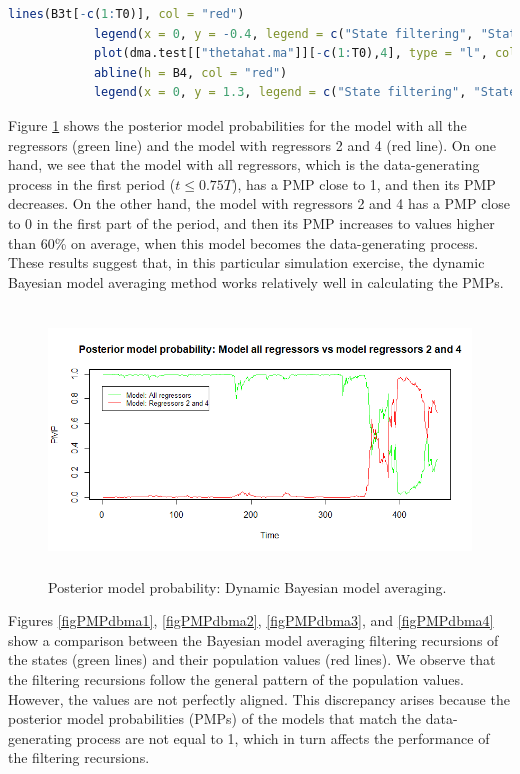 \begin{tcolorbox}[enhanced,width=4.67in,center upper,
	fontupper=\large\bfseries,drop shadow southwest,sharp corners]
\begin{VF}
\begin{lstlisting}[language=R]
			lines(B3t[-c(1:T0)], col = "red")
			legend(x = 0, y = -0.4, legend = c("State filtering", "State population"), col = c("green", "red"), lty=1:1, cex=0.8)
			plot(dma.test[["thetahat.ma"]][-c(1:T0),4], type = "l", col = "green", main = "Bayesian model average filtering recursion", xlab = "Time", ylab = TeX("$\\beta_{4t}$"))
			abline(h = B4, col = "red")
			legend(x = 0, y = 1.3, legend = c("State filtering", "State population"), col = c("green", "red"), lty=1:1, cex=0.8)
		\end{lstlisting}
	\end{VF}
\end{tcolorbox}

Figure \ref{figPMPdbma} shows the posterior model probabilities for the model with all the regressors (green line) and the model with regressors 2 and 4 (red line). On one hand, we see that the model with all regressors, which is the data-generating process in the first period ($t \leq 0.75T$), has a PMP close to 1, and then its PMP decreases. On the other hand, the model with regressors 2 and 4 has a PMP close to 0 in the first part of the period, and then its PMP increases to values higher than 60\% on average, when this model becomes the data-generating process. These results suggest that, in this particular simulation exercise, the dynamic Bayesian model averaging method works relatively well in calculating the PMPs.

\begin{figure}[!h]
	\includegraphics[width=340pt, height=200pt]{Chapters/chapter10/figures/figPMPdbma.png}
	\caption[List of figure caption goes here]{Posterior model probability: Dynamic Bayesian model averaging.}\label{figPMPdbma}
\end{figure}

Figures \ref{figPMPdbma1}, \ref{figPMPdbma2}, \ref{figPMPdbma3}, and \ref{figPMPdbma4} show a comparison between the Bayesian model averaging filtering recursions of the states (green lines) and their population values (red lines). We observe that the filtering recursions follow the general pattern of the population values. However, the values are not perfectly aligned. This discrepancy arises because the posterior model probabilities (PMPs) of the models that match the data-generating process are not equal to 1, which in turn affects the performance of the filtering recursions.  

